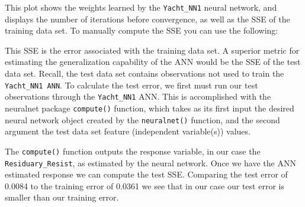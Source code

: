 \documentclass[]{book}
\newenvironment{Shaded}{\begin{snugshade}}{\end{snugshade}}
\newcommand{\CommentTok}[1]{\textcolor[rgb]{0.56,0.35,0.01}{\textit{#1}}}
\newcommand{\DecValTok}[1]{\textcolor[rgb]{0.00,0.00,0.81}{#1}}
\newcommand{\KeywordTok}[1]{\textcolor[rgb]{0.13,0.29,0.53}{\textbf{#1}}}
\newcommand{\NormalTok}[1]{#1}
\newcommand{\OperatorTok}[1]{\textcolor[rgb]{0.81,0.36,0.00}{\textbf{#1}}}
\newcommand{\StringTok}[1]{\textcolor[rgb]{0.31,0.60,0.02}{#1}}
\begin{document}
This plot shows the weights learned by the \texttt{Yacht\_NN1} neural network, and displays the number of iterations before convergence, as well as the SSE of the training data set. To manually compute the SSE you can use the following:

\begin{Shaded}
\end{Shaded}

This SSE is the error associated with the training data set. A superior metric for estimating the generalization capability of the ANN would be the SSE of the test data set. Recall, the test data set contains observations not used to train the \texttt{Yacht\_NN1\ ANN}. To calculate the test error, we first must run our test observations through the \texttt{Yacht\_NN1} ANN. This is accomplished with the neuralnet package \texttt{compute()} function, which takes as its first input the desired neural network object created by the \texttt{neuralnet()} function, and the second argument the test data set feature (independent variable(s)) values.

\begin{Shaded}
\end{Shaded}

The \texttt{compute()} function outputs the response variable, in our case the \texttt{Residuary\_Resist}, as estimated by the neural network. Once we have the ANN estimated response we can compute the test SSE. Comparing the test error of 0.0084 to the training error of 0.0361 we see that in our case our test error is smaller than our training error.
\end{document}
